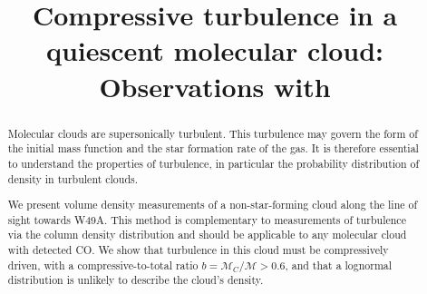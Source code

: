 \title{Compressive turbulence in a quiescent molecular cloud: Observations with
\formaldehyde}
\begin{abstract}
    Molecular clouds are supersonically turbulent.  This turbulence may govern
    the form of the initial mass function and the star formation rate of the
    gas.  It is therefore essential to understand the properties of turbulence,
    in particular the probability distribution of density in turbulent clouds.

    We present \formaldehyde volume density measurements of a non-star-forming
    cloud along the line of sight towards W49A.  This method is complementary
    to measurements of turbulence via the column density distribution and
    should be applicable to any molecular cloud with detected CO.  We show that
    turbulence in this cloud must be compressively driven, with a
    compressive-to-total ratio $b = \mathcal{M}_C/\mathcal{M}>0.6$, and that a
    lognormal distribution is unlikely to describe the cloud's density.  
\end{abstract}
